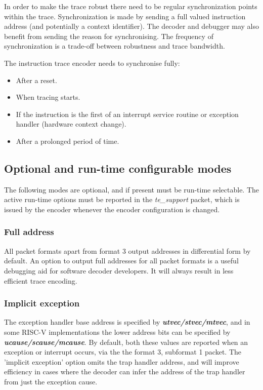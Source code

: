 In order to make the trace robust there need to be regular
synchronization points within the trace. Synchronization is made by
sending a full valued instruction address (and potentially a context
identifier). The decoder and debugger may also benefit from sending
the reason for synchronising. The frequency of synchronization is a
trade-off between robustness and trace bandwidth.

The instruction trace encoder needs to synchronise fully:

\begin{itemize}

\item After a reset.
  \item When tracing starts.
\item If the instruction is the first of an interrupt service routine or
exception handler (hardware context change).
\item After a prolonged period of time.
\end{itemize}

\subsection{Optional and run-time configurable modes} \label{optional}

The following modes are optional, and if present must be run-time selectable.  The 
active run-time options must be reported in the \textit{te\_support} packet, which is issued by the
encoder whenever the encoder configuration is changed.

\subsubsection{Full address} \label{sec:full-address}

All packet formats apart from format 3 output addresses in differential form by default.
An option to output full addresses for all packet formats is a useful debugging aid for 
software decoder developers.  It will always result in less efficient trace encoding.

\subsubsection{Implicit exception} \label{sec:implicit-exception}

The exception handler base address is specified by \textbf{\textit{utvec/stvec/mtvec}}, and 
in some RISC-V implementations the lower address bits can be specified by 
\textbf{\textit{ucause/scause/mcause}}.  
By default, both these values are reported when an exception or interrupt occurs, 
via the the format 3, subformat 1 packet.  The 'implicit exception' option omits the 
trap handler address, and will improve efficiency in cases where the decoder can infer 
the address of the trap handler from just the exception cause.

